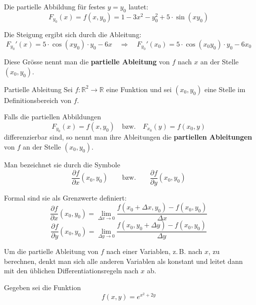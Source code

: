 Die partielle Abbildung für festes \( y = y_0 \) lautet:
\[
	F_{y_0}(x) = f(x, y_0)
	= 1 - 3x^2 - y_0^2 + 5 \cdot \sin(x y_0)
\]

Die Steigung ergibt sich durch die Ableitung:
\[
	F_{y_0}'(x) = 5 \cdot \cos(x y_0) \cdot y_0 - 6x
	\quad \Rightarrow \quad
	F_{y_0}'(x_0) = 5 \cdot \cos(x_0 y_0) \cdot y_0 - 6x_0
\]

Diese Grösse nennt man die \textbf{partielle Ableitung} von \( f \) nach \( x \) an der Stelle \( (x_0, y_0) \).

\begin{definition}
	{Partielle Ableitung}{}
	Sei \( f \colon \mathbb{R}^2 \to \mathbb{R} \) eine Funktion und sei \( (x_0, y_0) \) eine Stelle im Definitionsbereich von \( f \).

	Falls die partiellen Abbildungen
	\[
		F_{y_0}(x) = f(x, y_0) \quad \text{bzw.} \quad F_{x_0}(y) = f(x_0, y)
	\]
	differenzierbar sind, so nennt man ihre Ableitungen die \textbf{partiellen Ableitungen} von \( f \) an der Stelle \( (x_0, y_0) \).

	Man bezeichnet sie durch die Symbole
	\[
		\frac{\partial f}{\partial x}(x_0, y_0) \qquad \text{bzw.} \qquad
		\frac{\partial f}{\partial y}(x_0, y_0)
	\]

	Formal sind sie als Grenzwerte definiert:
	\[
		\frac{\partial f}{\partial x}(x_0, y_0) = \lim_{\Delta x \to 0} \frac{f(x_0 + \Delta x, y_0) - f(x_0, y_0)}{\Delta x}
	\]
	\[
		\frac{\partial f}{\partial y}(x_0, y_0)= \lim_{\Delta y \to 0} \frac{f(x_0, y_0 + \Delta y) - f(x_0, y_0)}{\Delta y}
	\]

\end{definition}
Um die partielle Ableitung von \( f \) nach einer Variablen, z.\,B. nach \( x \), zu berechnen,
denkt man sich alle anderen Variablen als konstant und leitet dann mit den üblichen Differentiationsregeln nach \( x \) ab.


\begin{bsp}
	{}{}
	Gegeben sei die Funktion
	\[
		f(x, y) = e^{x^2 + 2y}
	\]

	\vspace*{3cm}


\end{bsp}

